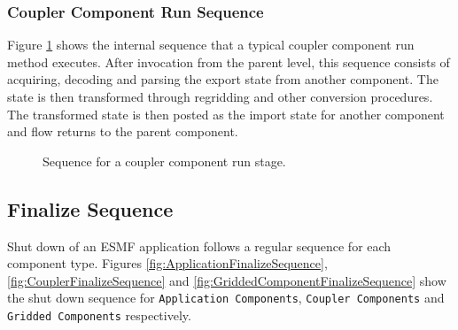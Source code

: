 \subsubsection{Coupler Component Run Sequence}
Figure \ref{fig:CouplerComponentsRunSequence} shows the internal sequence
that a typical coupler component run method executes. After invocation
from the parent level, this sequence consists
of acquiring, decoding and parsing the export state from another component.
The state is then transformed through regridding and other conversion
procedures. The transformed state is then posted as the import state
for another component and flow returns to the parent component.
\begin{figure}
\caption[{Coupler Component Run Sequence}]{Sequence for a coupler component
run stage.\\}
\begin{center}
\label{fig:CouplerComponentsRunSequence}
\end{center}
\end{figure}

\subsection{Finalize Sequence}
Shut down of an ESMF application follows a regular sequence for each component
type. Figures 
\ref{fig:ApplicationFinalizeSequence}, 
\ref{fig:CouplerFinalizeSequence} and 
\ref{fig:GriddedComponentFinalizeSequence} show the shut down sequence for 
{\tt Application Components}, {\tt Coupler Components} and {\tt Gridded Components} respectively.
